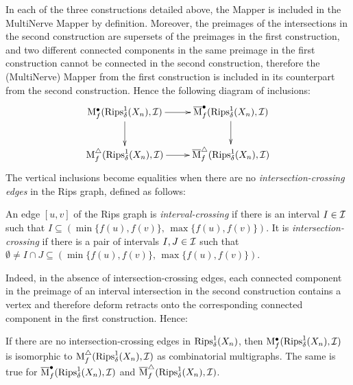 In each of the three constructions detailed above, the Mapper is included in the
MultiNerve Mapper by definition. Moreover, the preimages of the
intersections in the second construction are supersets of the preimages in the
first construction, and two different connected components in the same preimage in the first
construction cannot be connected in the second construction, therefore
the (MultiNerve) Mapper from the first construction is included in its
counterpart from the second construction. Hence the following diagram of
inclusions:
%
\begin{equation}\label{eq:cons_inc}
\xymatrix{
\Mapperv_f(\Rips^1_\delta(X_n), \I)\ar[r]\ar[d] &
\MMapperv_f(\Rips^1_\delta(X_n), \I)\ar[d] \\
\Mappere_f(\Rips^1_\delta(X_n), \I)\ar[r] &
\MMappere_f(\Rips^1_\delta(X_n), \I)
}
\end{equation}
%
The vertical inclusions become equalities when there are no
{\em intersection-crossing edges} in the Rips graph, defined as
follows:
%
\begin{defin}\label{def:crossing_edge}
An edge $[u,v]$ of the Rips graph is {\em interval-crossing} if there
is an interval $I\in \mathcal{I}$ such that $I\subseteq (\min\{f(u), f(v)\},\,
\max\{f(u), f(v)\})$. It is {\em intersection-crossing} if there is a
pair of intervals $I,J\in \mathcal{I}$ such that $\emptyset\neq I\cap
J\subseteq (\min\{f(u), f(v)\},\, \max\{f(u), f(v)\})$.
\end{defin}
%
Indeed, in the absence of intersection-crossing edges,
each connected component in the preimage of an interval intersection in the second
construction contains a vertex and therefore
deform retracts onto the corresponding connected component in the first
construction. Hence:
%
\begin{lem}\label{lem:cons_equ}
If there are no intersection-crossing edges in $\mathrm{Rips}^1_\delta(X_n)$, then
${\rm M}^\bullet_f(\mathrm{Rips}^1_\delta(X_n), \mathcal{I})$ is isomorphic to ${\rm M}^\triangle_f(\mathrm{Rips}^1_\delta(X_n),\mathcal{I})$  
as combinatorial multigraphs. The same is true for 
$\overline{\rm M}^\bullet_f(\mathrm{Rips}^1_\delta(X_n), \mathcal{I})$ and $\overline{\rm M}^\triangle_f(\mathrm{Rips}^1_\delta(X_n), \mathcal{I})$.
\end{lem}



